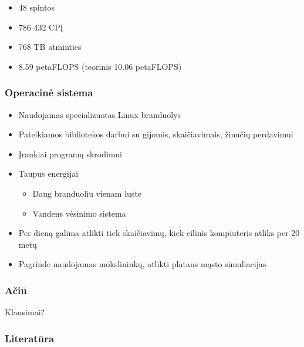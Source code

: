 \documentclass{beamer}
\begin{document}
    \begin{frame}
        \begin{itemize}
            \item 48 spintos
            \item 786 432 CPĮ
            \item 768 TB atminties
            \item 8.59 petaFLOPS (teorinis 10.06 petaFLOPS)
        \end{itemize}
    \end{frame}

    \begin{frame}
        \frametitle{Operacinė sistema}
        \begin{itemize}
            \item Naudojamas specializuotas Linux branduolys
            \item Pateikiamos bibliotekos darbui su gijomis, skaičiavimais, žinučių perdavimui
            \item Įrankiai programų skrodimui
        \end{itemize}
    \end{frame}

    \begin{frame}
        \begin{itemize}
            \item Taupus energijai
            \begin{itemize}
                \item Daug branduoliu vienam luste
                \item Vandens vėsinimo sistema
            \end{itemize}
            \item Per dieną galima atlikti tiek skaičiavimų, kiek eilinis kompiuteris atliks per 20 metų
            \item Pagrinde naudojamas mokslininkų, atlikti plataus mąsto simuliacijas
        \end{itemize}
    \end{frame}


    \begin{frame}
        \frametitle{Ačiū}

        Klausimai?

    \end{frame}

    \begin{frame}[allowframebreaks]
        \frametitle{Literatūra}
        
        
        
    \end{frame}
\end{document}
